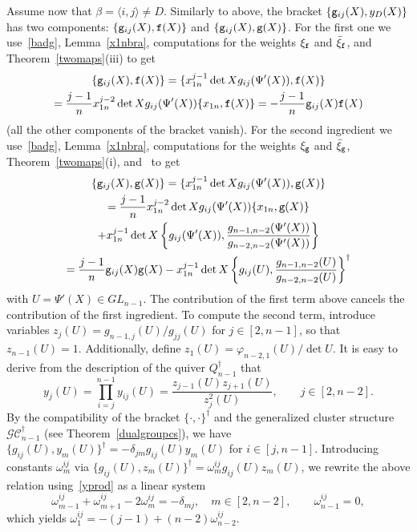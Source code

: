 \documentclass{amsart}
\theoremstyle{definition}
\theoremstyle{remark}
\numberwithin{equation}{section}
\numberwithin{theorem}{section}
\def\CC{{\mathcal C}}
\def\G{{\mathcal G}}
\def\ef{{\tt f}}
\def\eg{{\tt g}}
\def\fy{\varphi}
\def\Poi{{\{{\cdot},{\cdot}\}}}
\begin{document}
Assume now that $\beta=\langle i,j\rangle\ne D$. Similarly to above, the bracket $\{\eg_{ij}(X),y_D(X)\}$ has two components: $\{\eg_{ij}(X),\ef(X)\}$ and $\{\eg_{ij}(X),\eg(X)\}$. For the first one we use~\eqref{badg}, 
Lemma~\ref{x1nbra}, computations for the weights $\xi_\ef$ and $\bar\xi_\ef$, and Theorem~\ref{twomaps}(iii) to get
\begin{multline*}
\{\eg_{ij}(X),\ef(X)\}=\{x_{1n}^{j-1}\det X g_{ij}(\Psi'(X)),\ef(X)\}\\
=\frac{j-1}nx_{1n}^{j-2}\det X g_{ij}(\Psi'(X))
\{x_{1n},\ef(X)\}=-\frac{j-1}n\eg_{ij}(X)\ef(X)
\end{multline*}
(all the other components of the bracket vanish). For the second ingredient we use~\eqref{badg}, 
Lemma~\ref{x1nbra}, computations for the weights $\xi_\eg$ and $\bar\xi_\eg$, Theorem~\ref{twomaps}(i), 
and~\cite[Proposition 4.1]{GSVpullback} to get
\begin{multline*}
\{\eg_{ij}(X),\eg(X)\}=\{x_{1n}^{j-1}\det X g_{ij}(\Psi'(X)),\eg(X)\}\\
=\frac{j-1}nx_{1n}^{j-2}\det X g_{ij}(\Psi'(X))
\{x_{1n},\eg(X)\}\\
+x_{1n}^{j-1}\det X\left\{g_{ij}(\Psi'(X)),\frac{g_{n-1,n-2}(\Psi'(X))}{g_{n-2,n-2}(\Psi'(X))}\right\}\\
=\frac{j-1}n\eg_{ij}(X)\eg(X)-x_{1n}^{j-1}\det X\left\{g_{ij}(U),\frac{g_{n-1,n-2}(U)}{g_{n-2,n-2}(U)}\right\}^\dag
\end{multline*}
with $U=\Psi'(X)\in GL_{n-1}$.
The contribution of the first term above cancels the contribution of the first ingredient. To compute the second term, introduce variables $z_j(U)=g_{n-1,j}(U)/g_{jj}(U)$ for $j\in[2,n-1]$, so that $z_{n-1}(U)=1$. Additionally, define
$z_1(U)=\fy_{n-2,1}(U)/\det U$. It is easy to derive from the description of the quiver $Q_{n-1}^\dag$ that
\begin{equation}\label{yprod}
y_j(U)=\prod_{i=j}^{n-1}y_{ij}(U)=\frac{z_{j-1}(U)z_{j+1}(U)}{z_j^2(U)}, \qquad j\in[2,n-2].
\end{equation}
By the compatibility of the bracket $\Poi^\dag$ and the generalized cluster structure $\G\CC_{n-1}^\dag$ (see 
Theorem~\ref{dualgroupcs}), we have $\{g_{ij}(U),y_m(U)\}^\dag=-\delta_{jm}g_{ij}(U)y_m(U)$ for $i\in[j,n-1]$.
Introducing constants $\omega_m^{ij}$ via $\{g_{ij}(U),z_m(U)\}^\dag=\omega_m^{ij}g_{ij}(U)z_m(U)$, we rewrite the above relation using~\eqref{yprod} as a linear system
\[
\omega_{m-1}^{ij}+\omega_{m+1}^{ij}-2\omega_m^{ij}=-\delta_{mj},\quad m\in[2,n-2],\qquad \omega_{n-1}^{ij}=0,
\]
which yields $\omega_1^{ij}=-(j-1)+(n-2)\omega_{n-2}^{ij}$.
\end{document}
